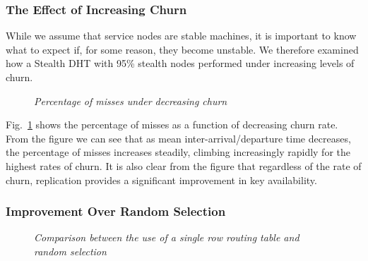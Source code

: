 \documentclass[letterpaper]{sig-alternate} %
\begin{document}
\subsubsection{The Effect of Increasing Churn}
\label{subsubsect-churn}

While we assume that service nodes are stable machines, it is
important to know what to expect if, for some reason, they become
unstable. We therefore examined how a Stealth DHT with 95\% stealth
nodes performed under increasing levels of churn.

\begin{figure}[tb]
\centering
{}
\caption{\em Percentage of misses under decreasing churn}
\label{fig:increasechurnstealth}
\end{figure}

Fig.~\ref{fig:increasechurnstealth} shows the percentage of misses as a
function of decreasing churn rate. From the figure we can see that as mean
inter-arrival/departure time decreases, the percentage of misses increases
steadily, climbing increasingly rapidly for the highest rates of churn. It is
also clear from the figure that regardless of the rate of churn, replication
provides a significant improvement in key availability.

\subsubsection{Improvement Over Random Selection}
\label{subsubsect-random}

\begin{figure}[tb]\centering
{}
\caption{\em Comparison between the use of a single row routing table and
random selection} \label{fig:random}
\end{figure}
\end{document}
